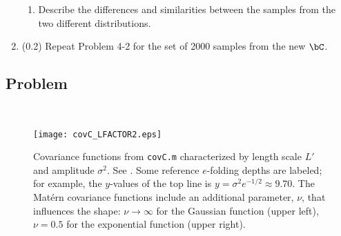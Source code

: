 \documentclass[11pt,titlepage,fleqn]{article}
\begin{document}
\begin{enumerate}
\begin{enumerate}
\item Describe the differences and similarities between the samples from the two different distributions.

\end{enumerate}


\item (0.2) Repeat Problem 4-2 for the set of 2000 samples from the new $\bC$.

\end{enumerate}


\pagebreak
\subsection*{Problem} \howmuchtime\





\clearpage\pagebreak
\begin{figure}
\centering
\texttt{[image: covC\_LFACTOR2.eps]}
\caption[]
{{
Covariance functions from {\tt covC.m} characterized by length scale $L'$ and amplitude $\sigma^2$.
See \citet[][Section 5.3.3, p. 113]{Tarantola2005}.
Some reference $e$-folding depths are labeled; for example, the $y$-values of the top line is $y = \sigma^2 e^{-1/2} \approx 9.70$.
The Mat\'ern covariance functions include an additional parameter, $\nu$, that influences the shape: $\nu \rightarrow \infty$ for the Gaussian function (upper left), $\nu = 0.5$ for the exponential function (upper right).
\label{fig:covC2}
}}
\end{figure}

\end{document}
